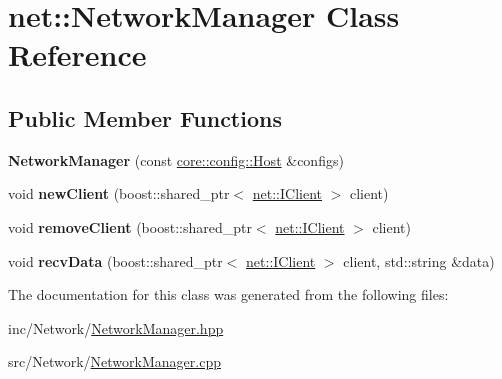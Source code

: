 \hypertarget{classnet_1_1NetworkManager}{}\section{net\+:\+:Network\+Manager Class Reference}
\label{classnet_1_1NetworkManager}
\subsection*{Public Member Functions}
\begin{DoxyCompactItemize}
\item 
\mbox{\label{classnet_1_1NetworkManager_ae958994e668d631672db8d6b83dd2076}} 
{\bfseries Network\+Manager} (const \hyperlink{classcore_1_1config_1_1Host}{core\+::config\+::\+Host} \&configs)
\item 
\mbox{\label{classnet_1_1NetworkManager_aa33a78312f6596a6d148b63cd1e8ffd6}} 
void {\bfseries new\+Client} (boost\+::shared\+\_\+ptr$<$ \hyperlink{structnet_1_1IClient}{net\+::\+I\+Client} $>$ client)
\item 
\mbox{\label{classnet_1_1NetworkManager_a4cd3c13ec5e4598277e7e26a943a00db}} 
void {\bfseries remove\+Client} (boost\+::shared\+\_\+ptr$<$ \hyperlink{structnet_1_1IClient}{net\+::\+I\+Client} $>$ client)
\item 
\mbox{\label{classnet_1_1NetworkManager_afa7e0c3ab9414749c09a16e73fd1d61c}} 
void {\bfseries recv\+Data} (boost\+::shared\+\_\+ptr$<$ \hyperlink{structnet_1_1IClient}{net\+::\+I\+Client} $>$ client, std\+::string \&data)
\end{DoxyCompactItemize}


The documentation for this class was generated from the following files\+:\begin{DoxyCompactItemize}
\item 
inc/\+Network/\hyperlink{NetworkManager_8hpp}{Network\+Manager.\+hpp}\item 
src/\+Network/\hyperlink{NetworkManager_8cpp}{Network\+Manager.\+cpp}\end{DoxyCompactItemize}
